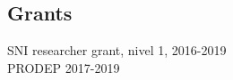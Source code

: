 \documentclass[overlapped,line,letterpaper]{res}
\begin{document}
\begin{resume}
\section {\sc Grants}
SNI researcher grant, nivel 1, 2016-2019 \\
PRODEP 2017-2019
\end{resume}
\end{document}
